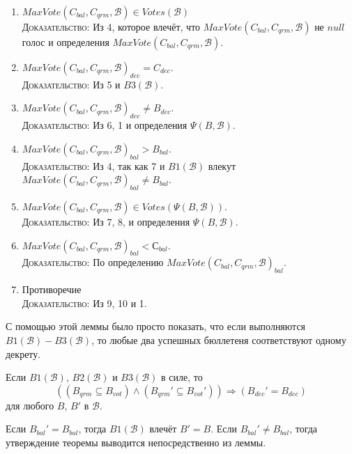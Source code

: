 \documentclass[12pt, a4paper]{article} %
\begin{document}
\begin{lemmaproof}
\begin{enumerate}
    \item $MaxVote(C_{bal}, C_{qrm}, \mathcal{B}) \in Votes(\mathcal{B})$\\
          \textsc{Доказательство}: Из 4, которое влечёт, что $MaxVote(C_{bal}, C_{qrm}, \mathcal{B})$ не $null$ голос и определения  $MaxVote(C_{bal}, C_{qrm}, \mathcal{B})$.

    \item $MaxVote(C_{bal}, C_{qrm}, \mathcal{B})_{dec} = C_{dec}$.\\
          \textsc{Доказательство}: Из 5 и $B3(\mathcal{B})$.

    \item $MaxVote(C_{bal}, C_{qrm}, \mathcal{B})_{dec} \neq B_{dec}$.\\
          \textsc{Доказательство}: Из 6, 1 и определения $\Psi(B, \mathcal{B})$.

    \item $MaxVote(C_{bal}, C_{qrm}, \mathcal{B})_{bal} > B_{bal}$.\\
          \textsc{Доказательство}: Из 4, так как 7 и $B1(\mathcal{B})$ влекут \\
          $MaxVote(C_{bal}, C_{qrm}, \mathcal{B})_{bal} \neq B_{bal}$.

    \item $MaxVote(C_{bal}, C_{qrm}, \mathcal{B}) \in Votes(\Psi(B, \mathcal{B}))$.\\
          \textsc{Доказательство}: Из 7, 8, и определения $\Psi(B, \mathcal{B})$.

    \item $MaxVote(C_{bal}, C_{qrm}, \mathcal{B})_{bal} < С_{bal}$.\\
          \textsc{Доказательство}: По определению $MaxVote(C_{bal}, C_{qrm}, \mathcal{B})_{bal}$.
    
    \item Противоречие\\
          \textsc{Доказательство}: Из 9, 10 и 1.
\end{enumerate}
\end{lemmaproof}

С помощью этой леммы было просто показать, что если выполняются $B1(\mathcal{B}) - B3(\mathcal{B})$, то любые два успешных бюллетеня соответствуют одному декрету.
\begin{theorem}
Если $B1(\mathcal{B})$, $B2(\mathcal{B})$ и $B3(\mathcal{B})$ в силе, то
\[
    ((B_{qrm} \subseteq B_{vot}) \land (B_{qrm}' \subseteq B_{vot}')) \Rightarrow (B_{dec}' = B_{dec})
\]
для любого $B$, $B'$ в $\mathcal{B}$.
\end{theorem}
\begin{theoremproof}
Если $B_{bal}' = B_{bal}$, тогда $B1(\mathcal{B})$ влечёт $B' = B$. Если $B_{bal}' \neq B_{bal}$, тогда утверждение теоремы выводится непосредственно из леммы.
\end{theoremproof}
\end{document}
